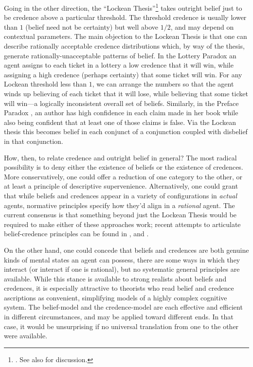 Going in the other direction, the ``Lockean Thesis''\footnote
{\citet[Bk.\ IV]{LockeEssay}. See also \citet{FoleyNet} for discussion.}
 takes outright belief just to be credence above a particular threshold. The threshold credence is usually lower than $1$ (belief need not be certainty) but well above $1/2$, and may depend on contextual parameters. The main objection to the Lockean Thesis is that one can describe rationally acceptable credence distributions which, by way of the thesis, generate rationally-unacceptable patterns of belief. In the Lottery Paradox \citep{KyburgProbability}\label{titelbaum-lottery} an agent assigns to each ticket in a lottery a low credence that it will win, while assigning a high credence (perhaps certainty) that some ticket will win. For any Lockean threshold less than $1$, we can arrange the numbers so that the agent winds up believing of each ticket that it will lose, while believing that some ticket will win---a logically inconsistent overall set of beliefs. Similarly, in the Preface Paradox \citep{MakinsonPreface}, an author has high confidence in each claim made in her book while also being confident that at least one of those claims is false. Via the Lockean thesis this becomes belief in each conjunct of a conjunction coupled with disbelief in that conjunction.
 
How, then, to relate credence and outright belief in general? The most radical possibility is to deny either the existence of beliefs or the existence of credences. More conservatively, one could offer a reduction of one category to the other, or at least a principle of descriptive supervenience. Alternatively, one could grant that while beliefs and credences appear in a variety of configurations in \emph{actual} agents, normative principles specify how they'd align in a \emph{rational} agent. The current consensus is that something beyond just the Lockean Thesis would be required to make either of these approaches work; recent attempts to articulate belief-credence principles can be found in \citet{LeitgebStability,DouvenPragmatics}, and \citet{LinKellyGeological}.

On the other hand, one could concede that beliefs and credences are both genuine kinds of mental states an agent can possess, there are some ways in which they interact (or interact if one is rational), but no systematic general principles are available. While this stance is available to strong realists about beliefs and credences, it is especially attractive to theorists who read belief and credence ascriptions as convenient, simplifying models of a highly complex cognitive system. The belief-model and the credence-model are each effective and efficient in different circumstances, and may be applied toward different ends. In that case, it would be unsurprising if no universal translation from one to the other were available.  
 



